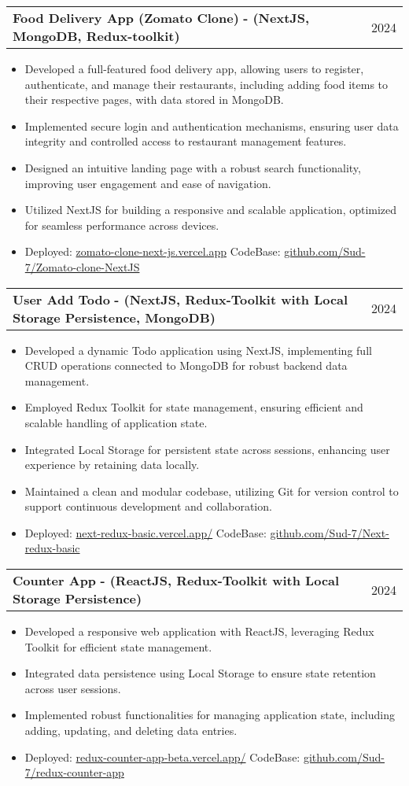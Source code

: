 \documentclass[letterpaper,11pt]{article}
\makeatletter
\newcommand{\resumeItem}[1]{
  \item\small{
    {#1 \vspace{-2pt}}
  }
}
\newcommand{\resumeProjectHeading}[2]{
    \vspace{-2pt}\item
    \begin{tabular*}{0.97\textwidth}[t]{l@{\extracolsep{\fill}}r}
      \small#1 & #2 \\
    \end{tabular*}\vspace{-7pt}
}
\newcommand{\resumeItemListStart}{\begin{itemize}}
\newcommand{\resumeItemListEnd}{\end{itemize}\vspace{-5pt}}
\makeatother
\begin{document}
    \resumeProjectHeading
      {\textbf{Food Delivery App (Zomato Clone)} \textbf{- (NextJS, MongoDB, Redux-toolkit) }}{2024}
        \resumeItemListStart
            \resumeItem{Developed a full-featured food delivery app, allowing users to register, authenticate, and manage their restaurants, including adding food items to their respective pages, with data stored in MongoDB.}
            \resumeItem{Implemented secure login and authentication mechanisms, ensuring user data integrity and controlled access to restaurant management features.}
            \resumeItem{Designed an intuitive landing page with a robust search functionality, improving user engagement and ease of navigation.}
            \resumeItem{Utilized NextJS for building a responsive and scalable application, optimized for seamless performance across devices.}
            \resumeItem{Deployed: \href{https://zomato-clone-next-js.vercel.app}{zomato-clone-next-js.vercel.app}}{{CodeBase: \href{https://github.com/Sud-7/Zomato-clone-NextJS}{github.com/Sud-7/Zomato-clone-NextJS}}}
        \resumeItemListEnd

    
    \resumeProjectHeading
      {\textbf{User Add Todo}  \textbf {- (NextJS, Redux-Toolkit with Local Storage Persistence, MongoDB) }} {2024}
        \resumeItemListStart
            \resumeItem{Developed a dynamic Todo application using NextJS, implementing full CRUD operations connected to MongoDB for robust backend data management.}
            \resumeItem{Employed Redux Toolkit for state management, ensuring efficient and scalable handling of application state.}
            \resumeItem{Integrated Local Storage for persistent state across sessions, enhancing user experience by retaining data locally.}
            \resumeItem{Maintained a clean and modular codebase, utilizing Git for version control to support continuous development and collaboration.}
            \resumeItem{Deployed: \href{https://next-redux-basic.vercel.app/}{next-redux-basic.vercel.app/}}{CodeBase: \href{https://github.com/Sud-7/Next-redux-basic}{github.com/Sud-7/Next-redux-basic}}
        \resumeItemListEnd
    
    \resumeProjectHeading
      {\textbf{Counter App}  \textbf {- (ReactJS, Redux-Toolkit with Local Storage Persistence) }}{2024}
        \resumeItemListStart
            \resumeItem{Developed a responsive web application with ReactJS, leveraging Redux Toolkit for efficient state management.}
            \resumeItem{Integrated data persistence using Local Storage to ensure state retention across user sessions.}
            \resumeItem{Implemented robust functionalities for managing application state, including adding, updating, and deleting data entries.}
            \resumeItem{Deployed: \href{https://redux-counter-app-beta.vercel.app/}{redux-counter-app-beta.vercel.app/}}{CodeBase: \href{https://github.com/Sud-7/redux-counter-app}{github.com/Sud-7/redux-counter-app}}
        \resumeItemListEnd
    
\end{document}

